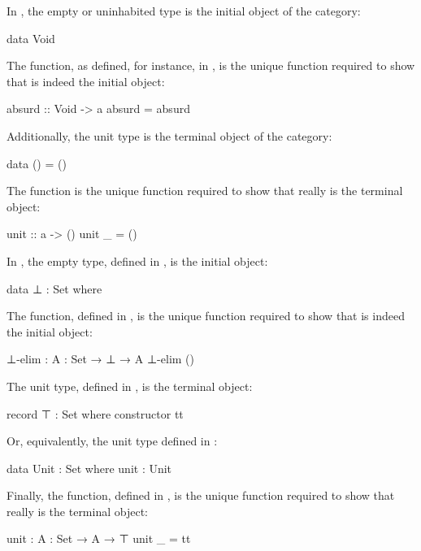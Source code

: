 \begin{example}
  \label{ex:initial-terminal-objects-haskell}

  In \hask, the empty or uninhabited type is the initial object of the
  category:
  \begin{codehaskell}
data Void
  \end{codehaskell}
  The  function, as defined, for instance, in
  \parencite{kmett-2012}, is the unique function required to show that
   is indeed the initial object:
  \begin{codehaskell}
absurd :: Void -> a
absurd = absurd
  \end{codehaskell}
  Additionally, the unit type is the terminal object of the category:
  \begin{codehaskell}
data () = ()
  \end{codehaskell}
  The  function is the unique function required to
  show that \texthaskell{()} really is the terminal object:
  \begin{codehaskell}
unit :: a -> ()
unit _ = ()
  \end{codehaskell}

\end{example}

\begin{example}
  \label{ex:initial-terminal-objects-agda}

  In \agda, the empty type, defined in , is the
  initial object:
  \begin{codeagda}
data ⊥ : Set where
  \end{codeagda}
  The  function, defined in ,
  is the unique function required to show that  is indeed
  the initial object:
  \begin{codeagda}
⊥-elim : {A : Set} → ⊥ → A
⊥-elim ()
  \end{codeagda}
  The unit type, defined in , is the terminal
  object:
  \begin{codeagda}
record ⊤ : Set where
  constructor tt
  \end{codeagda}
  Or, equivalently, the unit type defined in :
  \begin{codeagda}
data Unit : Set where
  unit : Unit
  \end{codeagda}
  Finally, the  function, defined in
  , is the unique function required to show
  that  really is the terminal object:
  \begin{codeagda}
unit : {A : Set} → A → ⊤
unit _ = tt
  \end{codeagda}

\end{example}

